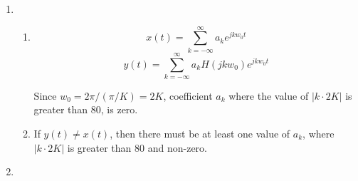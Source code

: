 \documentclass[10pt,a4paper, margin=1in]{article}
\begin{document}
\begin{enumerate}
\begin{enumerate}
\begin{figure}[!htbp]
\begin{center}
        \end{center}
    \end{figure}
    
    \end{enumerate}
    
\item %
    \begin{enumerate}
    \item %
        \begin{equation*}
            x(t) = \sum_{k=-\infty}^{\infty} a_k e^{jkw_0t}
        \end{equation*}
        \begin{equation*}
            y(t) = \sum_{k=-\infty}^{\infty} a_k H(jkw_0) e^{jkw_0t}
        \end{equation*}

        Since $w_0 = 2\pi / (\pi / K) = 2K$, coefficient $a_k$ where the value of $|k\cdot2K|$ is greater than $80$, is zero.
    \item %
        If $y(t) \neq x(t)$, then there must be at least one value of $a_k$, where $|k\cdot2K|$ is greater than $80$ and non-zero.
    \end{enumerate}    
	
\item %

\end{enumerate}
\end{document}

